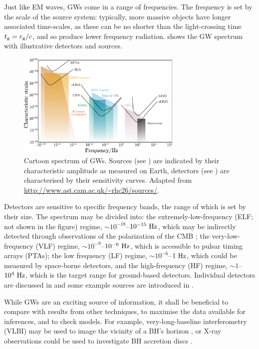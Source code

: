 Just like EM waves, GWs come in a range of frequencies. The frequency is set by the scale of the source system: typically, more massive objects have longer associated time-scales, as these can be no shorter than the light-crossing time $t_\mathrm{g} = r_\mathrm{g}/c$, and so produce lower frequency radiation.  shows the GW spectrum with illustrative detectors and sources. 
\begin{figure}
  \centering
  \includegraphics[width=0.7\textwidth]{./images/GW_spectrum}
    \caption{Cartoon spectrum of GWs. Sources (see ) are indicated by their characteristic amplitude as measured on Earth, detectors (see ) are characterised by their sensitivity curves. Adapted from \url{http://www.ast.cam.ac.uk/~rhc26/sources/}.}   
    \label{fig:spectrum} 
\end{figure}
Detectors are sensitive to specific frequency bands, the range of which is set by their size. The spectrum may be divided into: the extremely-low-frequency (ELF; not shown in the figure) regime, $\sim10^{-18}$--$10^{-15}~\mathrm{Hz}$, which may be indirectly detected through observations of the polarization of the CMB \citep[e.g.,][]{Hu1997,Kamionkowski1997}; the very-low-frequency (VLF) regime, $\sim10^{-9}$--$10^{-6}~\mathrm{Hz}$, which is accessible to pulsar timing arrays (PTAs); the low frequency (LF) regime, $\sim10^{-6}$--$1~\mathrm{Hz}$, which could be measured by space-borne detectors, and the high-frequency (HF) regime, $\sim1$--$10^4~\mathrm{Hz}$, which is the target range for ground-based detectors. Individual detectors are discussed in  and some example sources are introduced in .

While GWs are an exciting source of information, it shall be beneficial to compare with results from other techniques, to maximise the data available for inferences, and to check models. For example, very-long-baseline interferometry (VLBI) may be used to image the vicinity of a BH's horizon \citep{Doeleman2008,Johannsen2012a}, or X-ray observations could be used to investigate BH accretion discs \citep{Psaltis2008}.

